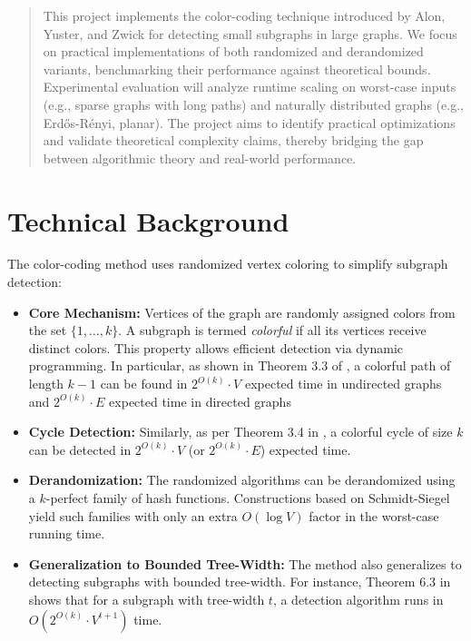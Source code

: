 \pagestyle{fancy}
\fancyhf{}
\fancyfoot[C]{\thepage}



\maketitle

\begin{abstract}
This project implements the color-coding technique introduced by Alon, Yuster, and Zwick \cite{alon1995color} for detecting small subgraphs in large graphs. We focus on practical implementations of both randomized and derandomized variants, benchmarking their performance against theoretical bounds. Experimental evaluation will analyze runtime scaling on worst-case inputs (e.g., sparse graphs with long paths) and naturally distributed graphs (e.g., Erd\H{o}s-R\'enyi, planar). The project aims to identify practical optimizations and validate theoretical complexity claims, thereby bridging the gap between algorithmic theory and real-world performance.
\end{abstract}

\section{Technical Background}
The color-coding method \cite{alon1995color} uses randomized vertex coloring to simplify subgraph detection:
\begin{itemize}
    \item \textbf{Core Mechanism:} Vertices of the graph are randomly assigned colors from the set \( \{1,\dots,k\} \). A subgraph is termed \emph{colorful} if all its vertices receive distinct colors. This property allows efficient detection via dynamic programming. In particular, as shown in Theorem 3.3 of \cite{alon1995color}, a colorful path of length \( k-1 \) can be found in \(2^{O(k)} \cdot V\) expected time in undirected graphs and \(2^{O(k)} \cdot E\) expected time in directed graphs 
    \item \textbf{Cycle Detection:} Similarly, as per Theorem 3.4 in \cite{alon1995color}, a colorful cycle of size \(k\) can be detected in \(2^{O(k)} \cdot V\) (or \(2^{O(k)} \cdot E\)) expected time.
    \item \textbf{Derandomization:} The randomized algorithms can be derandomized using a \(k\)-perfect family of hash functions. Constructions based on Schmidt-Siegel \cite{schmidt1990spatial} yield such families with only an extra \(O(\log V)\) factor in the worst-case running time.
    \item \textbf{Generalization to Bounded Tree-Width:} The method also generalizes to detecting subgraphs with bounded tree-width. For instance, Theorem 6.3 in \cite{alon1995color} shows that for a subgraph with tree-width \(t\), a detection algorithm runs in \(O(2^{O(k)} \cdot V^{t+1})\) time.
\end{itemize}


